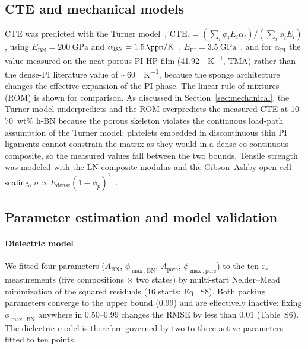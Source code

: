 \documentclass[preprint,a4paper]{elsarticle}
\newcommand{\eps}{\ensuremath{\varepsilon_r}}   %
\newcommand{\Apore}{\ensuremath{A_{\mathrm{pore}}}}
\newcommand{\ABN}{\ensuremath{A_{\mathrm{BN}}}}
\begin{document}
\subsection{CTE and mechanical models}
\label{sec:cte}
CTE was predicted with the Turner model~\cite{turner1946thermal}, $\mathrm{CTE}_c = (\sum_i \phi_i E_i \alpha_i)/(\sum_i \phi_i E_i)$, using $E_{\mathrm{BN}} = \SI{200}{\giga\pascal}$ and $\alpha_{\mathrm{BN}} = \SI{1.5}{\ppm\per\kelvin}$~\cite{ou2021enhancement}, $E_{\mathrm{PI}} = \SI{3.5}{\giga\pascal}$~\cite{tan2022facile}, and for $\alpha_{\mathrm{PI}}$ the value measured on the neat porous PI HP film (\SI{41.92}{\ppm\per\kelvin}, TMA) rather than the dense-PI literature value of $\sim$\SI{60}{\ppm\per\kelvin}, because the sponge architecture changes the effective expansion of the PI phase. The linear rule of mixtures (ROM) is shown for comparison. As discussed in Section~\ref{sec:mechanical}, the Turner model underpredicts and the ROM overpredicts the measured CTE at 10--70~wt\% h-BN because the porous skeleton violates the continuous load-path assumption of the Turner model: platelets embedded in discontinuous thin PI ligaments cannot constrain the matrix as they would in a dense co-continuous composite, so the measured values fall between the two bounds. Tensile strength was modeled with the LN composite modulus and the Gibson--Ashby open-cell scaling, $\sigma \propto E_{\mathrm{dense}}(1-\phi_p)^2$~\cite{gibson1997cellular}.

\subsection{Parameter estimation and model validation}
\label{sec:paramest}
\paragraph{Dielectric model} We fitted four parameters (\ABN, $\phi_{\max,\mathrm{BN}}$, \Apore, $\phi_{\max,\mathrm{pore}}$) to the ten \eps{} measurements (five compositions $\times$ two states) by multi-start Nelder--Mead minimization of the squared residuals (16 starts; Eq.~S8). Both packing parameters converge to the upper bound (0.99) and are effectively inactive: fixing $\phi_{\max,\mathrm{BN}}$ anywhere in 0.50--0.99 changes the RMSE by less than 0.01 (Table~S6). The dielectric model is therefore governed by two to three active parameters fitted to ten points.
\end{document}
